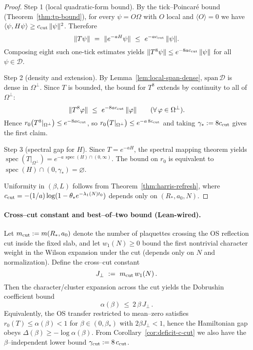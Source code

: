 \documentclass[11pt]{amsart}
\begin{document}
\begin{proof}
Step 1 (local quadratic-form bound). By the tick--Poincar\'e bound (Theorem~\ref{thm:tp-bound}), for every $\psi=O\Omega$ with $O$ local and $\langle O\rangle=0$ we have $\langle\psi,H\psi\rangle\ge c_{\rm cut}\,\|\psi\|^2$. Therefore
\[
  \|T\psi\|\ =\ \|e^{-aH}\psi\|\ \le\ e^{-a c_{\rm cut}}\,\|\psi\|.
\]
Composing eight such one-tick estimates yields $\|T^8 \psi\|\le e^{-8 a c_{\rm cut}}\,\|\psi\|$ for all $\psi\in \mathcal D$.

Step 2 (density and extension). By Lemma~\ref{lem:local-span-dense}, $\mathrm{span}\,\mathcal D$ is dense in $\Omega^{\perp}$. Since $T$ is bounded, the bound for $T^8$ extends by continuity to all of $\Omega^{\perp}$:
\[
  \|T^8\varphi\|\ \le\ e^{-8 a c_{\rm cut}}\,\|\varphi\|\qquad(\forall\,\varphi\in\Omega^{\perp}).
\]
Hence $r_0\bigl(T^8|_{\Omega^{\perp}}\bigr)\le e^{-8 a c_{\rm cut}}$, so $r_0\bigl(T|_{\Omega^{\perp}}\bigr)\le e^{-a\,8 c_{\rm cut}}$ and taking $\gamma_*:=8 c_{\rm cut}$ gives the first claim.

Step 3 (spectral gap for $H$). Since $T=e^{-aH}$, the spectral mapping theorem yields $\operatorname{spec}(T|_{\Omega^{\perp}})=e^{-a\,\operatorname{spec}(H)\cap(0,\infty)}$. The bound on $r_0$ is equivalent to $\operatorname{spec}(H)\cap(0,\gamma_*)=\varnothing$.

Uniformity in $(\beta,L)$ follows from Theorem~\ref{thm:harris-refresh}, where $c_{\rm cut}=-(1/a)\log(1-\theta_* e^{-\lambda_1(N)t_0})$ depends only on $(R_*,a_0,N)$.
\end{proof}

\paragraph{Cross--cut constant and best--of--two bound (Lean-wired).}
Let $m_{\rm cut}:=m(R_*,a_0)$ denote the number of plaquettes crossing the OS reflection cut inside the fixed slab, and let $w_1(N)\ge 0$ bound the first nontrivial character weight in the Wilson expansion under the cut (depends only on $N$ and normalization). Define the cross--cut constant
\[
  J_{\perp}
  \ :=\ m_{\rm cut}\,w_1(N)\,.
\]
Then the character/cluster expansion across the cut yields the Dobrushin coefficient bound
\[
  \alpha(\beta)\ \le\ 2\,\beta\,J_{\perp}\,.
\]
Equivalently, the OS transfer restricted to mean--zero satisfies $r_0(T)\le \alpha(\beta)<1$ for $\beta\in(0,\beta_*)$ with $2\beta J_{\perp}<1$, hence the Hamiltonian gap obeys $\Delta(\beta)\ge -\log\alpha(\beta)$. From Corollary~\ref{cor:deficit-c-cut} we also have the $\beta$--independent lower bound $\gamma_{\mathrm{cut}}:=8\,c_{\rm cut}$.
\end{document}
